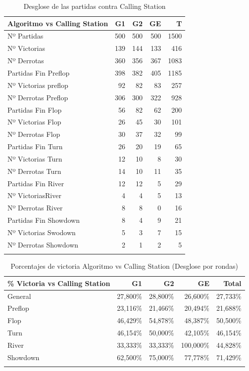 \begin{longtable}[c]{lrrrr}
\hline
Algoritmo vs Calling Station & G1 & G2 & GE & T \\ \hline
Nº Partidas & 500 & 500 & 500 & 1500 \\ 
Nº Victorias & 139 & 144 & 133 & 416 \\ 
Nº Derrotas & 360 & 356 & 367 & 1083 \\ 
Partidas Fin Preflop & 398 & 382 & 405 & 1185 \\ 
Nº Victorias preflop & 92 & 82 & 83 & 257 \\ 
Nº Derrotas Preflop & 306 & 300 & 322 & 928 \\ 
Partidas Fin Flop & 56 & 82 & 62 & 200 \\ 
Nº Victorias Flop & 26 & 45 & 30 & 101 \\ 
Nº Derrotas Flop & 30 & 37 & 32 & 99 \\ 
Partidas Fin Turn & 26 & 20 & 19 & 65 \\ 
Nº Victorias Turn & 12 & 10 & 8 & 30 \\ 
Nº Derrotas Turn & 14 & 10 & 11 & 35 \\ 
Partidas Fin River & 12 & 12 & 5 & 29 \\ 
Nº VictoriasRiver & 4 & 4 & 5 & 13 \\ 
Nº Derrotas River & 8 & 8 & 0 & 16 \\ 
Partidas Fin Showdown & 8 & 4 & 9 & 21 \\ 
Nº Victorias Swodown & 5 & 3 & 7 & 15 \\ 
Nº Derrotas Showdown & 2 & 1 & 2 & 5 \\ \hline
\caption{Desglose de las partidas contra Calling Station}
\label{tab:PlaysC}
\end{longtable}

\begin{longtable}[c]{lrrrr}
\hline
\% Victoria vs Calling Station & G1 & G2 & GE & Total \\ \hline
General & 27,800\% & 28,800\% & 26,600\% & 27,733\% \\ 
Preflop & 23,116\% & 21,466\% & 20,494\% & 21,688\% \\ 
Flop & 46,429\% & 54,878\% & 48,387\% & 50,500\% \\ 
Turn & 46,154\% & 50,000\% & 42,105\% & 46,154\% \\ 
River & 33,333\% & 33,333\% & 100,000\% & 44,828\% \\ 
Showdown & 62,500\% & 75,000\% & 77,778\% & 71,429\% \\ \hline
\caption{Porcentajes de victoria Algoritmo vs Calling Station (Desglose por rondas)}
\label{tab:winrateC}
\end{longtable}


